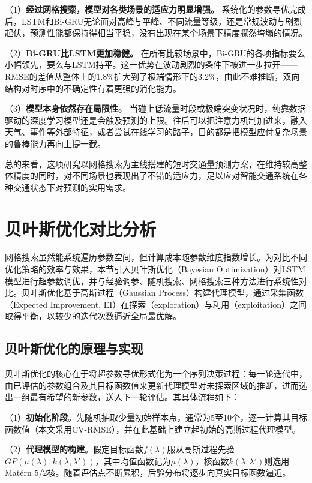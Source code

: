 \documentclass[12pt,a4paper,oneside]{ctexbook}
\begin{document}
	（1）\textbf{经过网格搜索，模型对各类场景的适应力明显增强。} 系统化的参数寻优完成后，LSTM和Bi-GRU无论面对高峰与平峰、不同流量等级，还是常规波动与剧烈起伏，预测性能都保持得相当平稳，没有出现在某个场景下精度骤然垮塌的情况。
	
	（2）\textbf{Bi-GRU比LSTM更加稳健。} 在所有比较场景中，Bi-GRU的各项指标要么小幅领先，要么与LSTM持平。这一优势在波动剧烈的条件下被进一步拉开——RMSE的差值从整体上的1.8\%扩大到了极端情形下的3.2\%，由此不难推断，双向结构对时序中的不确定性有着更强的消化能力。
	
	（3）\textbf{模型本身依然存在局限性。} 当碰上低流量时段或极端突变状况时，纯靠数据驱动的深度学习模型还是会触及预测的上限。往后可以把注意力机制加进来，融入天气、事件等外部特征，或者尝试在线学习的路子，目的都是把模型应付复杂场景的鲁棒能力再向上提一截。
	
	总的来看，这项研究以网格搜索为主线搭建的短时交通量预测方案，在维持较高整体精度的同时，对不同场景也表现出了不错的适应力，足以应对智能交通系统在各种交通状态下对预测的实用需求。
	
	\section{贝叶斯优化对比分析}
	
	网格搜索虽然能系统遍历参数空间，但计算成本随参数维度指数增长。为对比不同优化策略的效率与效果，本节引入贝叶斯优化（Bayesian Optimization）对LSTM模型进行超参数调优，并与经验调参、随机搜索、网格搜索三种方法进行系统性对比。贝叶斯优化基于高斯过程（Gaussian Process）构建代理模型，通过采集函数（Expected Improvement, EI）在探索（exploration）与利用（exploitation）之间取得平衡，以较少的迭代次数逼近全局最优解。
	
	\subsection{贝叶斯优化的原理与实现}
	
	贝叶斯优化的核心在于将超参数寻优形式化为一个序列决策过程：每一轮迭代中，由已评估的参数组合及其目标函数值来更新代理模型对未探索区域的推断，进而选出一组最有希望的新参数，送入下一轮评估。其具体流程如下：
	
	（1）\textbf{初始化阶段}。先随机抽取少量初始样本点，通常为5至10个，逐一计算其目标函数值（本文采用CV-RMSE），并在此基础上建立起初始的高斯过程代理模型。
	
	（2）\textbf{代理模型的构建}。假定目标函数$f(\lambda)$服从高斯过程先验$GP(\mu(\lambda), k(\lambda, \lambda'))$，其中均值函数记为$\mu(\lambda)$，核函数$k(\lambda, \lambda')$则选用Matérn 5/2核。随着评估点不断累积，后验分布将逐步向真实目标函数逼近。
	
\end{document}
